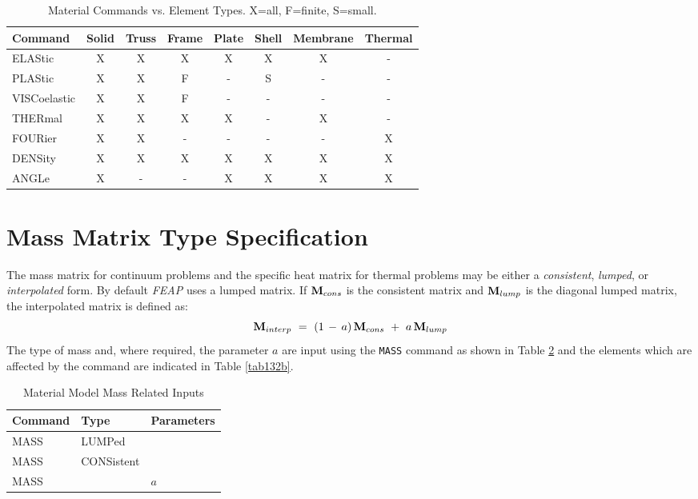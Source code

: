 \begin{table}[ht!]
\begin{center}
\begin{tabular}{| l | c | c | c | c | c | c | c |} \hline
Command & Solid & Truss & Frame & Plate & Shell & Membrane & Thermal \\ \hline
ELAStic       & X & X & X & X & X & X & - \\
PLAStic       & X & X & F & - & S & - & - \\
VISCoelastic  & X & X & F & - & - & - & - \\
THERmal       & X & X & X & X & - & X & - \\
FOURier       & X & X & - & - & - & - & X \\
DENSity       & X & X & X & X & X & X & X \\
ANGLe         & X & - & - & X & X & X & X \\ \hline
\end{tabular}
\end{center}
\caption{Material Commands vs. Element Types. X=all, F=finite, S=small.}
\label{tab131b}
\end{table}

\section{Mass Matrix Type Specification}
\label{masstype}

The mass matrix for continuum problems and the specific heat matrix
for thermal problems may be either a {\it consistent}, {\it lumped},
or {\it interpolated} form.  By default {\it FEAP} uses a lumped matrix.
If $\mathbf{M}_{cons}$ is the consistent matrix and $\mathbf{M}_{lump}$ is the diagonal
lumped matrix, the interpolated matrix is defined as:
\begin{equation}
\mathbf{M}_{interp} ~=~ (1 \,-\, a) \, \mathbf{M}_{cons} ~+~ a \, \mathbf{M}_{lump}
\end{equation}
The type of mass and, where required,
the parameter $a$ are input using the {\tt MASS} command as shown in
Table \ref{tab132a} and the elements which are affected by the command
are indicated in Table \ref{tab132b}.

\begin{table}[ht!]
\begin{center}
\begin{tabular}{| l | l | l |} \hline
Command & Type & Parameters \\ \hline
MASS & LUMPed       & {}  \\
MASS & CONSistent   & {}  \\
MASS & {}           & $a$ \\ \hline
\end{tabular}
\end{center}
\caption{Material Model Mass Related Inputs}
\label{tab132a}
\end{table}

